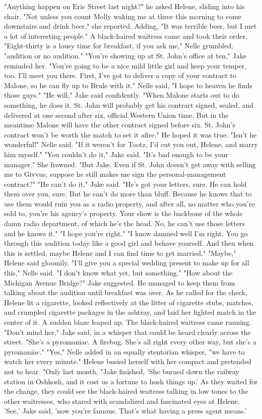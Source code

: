 \documentclass{novel}
\begin{document}
"Anything happen on Erie Street last night?" he asked Helene, sliding into his chair. "Not unless you count Molly waking me at three this morning to come downstairs and drink beer," she reported. Adding, "It was terrible beer, but I met a lot of interesting people." A black-haired waitress came and took their order. "Eight-thirty is a lousy time for breakfast, if you ask me," Nelle grumbled, "audition or no audition." "You're showing up at St. John's office at ten," Jake reminded her. "You're going to be a nice mild little girl and keep your temper, too. I'll meet you there. First, I've got to deliver a copy of your contract to Malone, so he can fly up to Brule with it." Nelle said, "I hope to heaven he finds those guys." "He will," Jake said confidently. "When Malone starts out to do something, he does it. St. John will probably get his contract signed, sealed, and delivered at one second after six, official Western Union time. But in the meantime Malone will have the other contract signed before six. St. John's contract won't be worth the match to set it afire." He hoped it was true. "Isn't he wonderful!" Nelle said. "If it weren't for Tootz, I'd cut you out, Helene, and marry him myself." "You couldn't do it," Jake said. "It's bad enough to be your manager." She frowned. "But Jake. Even if St. John doesn't get away with selling me to Givvus, suppose he still makes me sign the personal-management contract?" "He can't do it," Jake said. "He's got your letters, sure. He can hold them over you, sure. But he can't do more than bluff. Because he knows that to use them would ruin you as a radio property, and after all, no matter who you're sold to, you're his agency's property. Your show is the backbone of the whole damn radio department, of which he's the head. No, he can't use those letters and he knows it." "I hope you're right." "I know damned well I'm right. You go through this audition today like a good girl and behave yourself. And then when this is settled, maybe Helene and I can find time to get married." "Maybe," Helene said gloomily. "I'll give you a special wedding present to make up for all this," Nelle said. "I don't know what yet, but something." "How about the Michigan Avenue Bridge?" Jake suggested. He managed to keep them from talking about the audition until breakfast was over. As he called for the check, Helene lit a cigarette, looked reflectively at the litter of cigarette stubs, matches, and crumpled cigarette packages in the ashtray, and laid her lighted match in the center of it. A sudden blaze leaped up. The black-haired waitress came running. "Don't mind her," Jake said, in a whisper that could be heard clearly across the street. "She's a pyromaniac. A firebug. She's all right every other way, but she's a pyromaniac." "Yes," Nelle added in an equally stentorian whisper, "we have to watch her every minute." Helene busied herself with her compact and pretended not to hear. "Only last month, "Jake finished, 'She burned down the railway station in Oshkosh, and it cost us a fortune to hush things up.' As they waited for the change, they could see the black-haired waitress talking in low tones to the other waitresses, who stared with scandalized and fascinated eyes at Helene. 'See,' Jake said, 'now you’re famous. That’s what having a press agent means.' 
\end{document}
